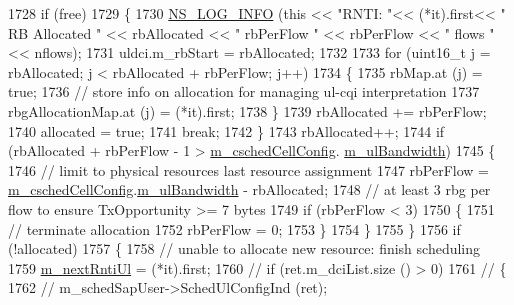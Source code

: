 \begin{DoxyCode}
1728           \textcolor{keywordflow}{if} (free)
1729             \{
1730               \hyperlink{group__logging_gafbd73ee2cf9f26b319f49086d8e860fb}{NS\_LOG\_INFO} (\textcolor{keyword}{this} << \textcolor{stringliteral}{"RNTI: "}<< (*it).first<< \textcolor{stringliteral}{" RB Allocated "} << rbAllocated << \textcolor{stringliteral}{"
       rbPerFlow "} << rbPerFlow << \textcolor{stringliteral}{" flows "} << nflows);
1731               uldci.m\_rbStart = rbAllocated;
1732 
1733               \textcolor{keywordflow}{for} (uint16\_t j = rbAllocated; j < rbAllocated + rbPerFlow; j++)
1734                 \{
1735                   rbMap.at (j) = \textcolor{keyword}{true};
1736                   \textcolor{comment}{// store info on allocation for managing ul-cqi interpretation}
1737                   rbgAllocationMap.at (j) = (*it).first;
1738                 \}
1739               rbAllocated += rbPerFlow;
1740               allocated = \textcolor{keyword}{true};
1741               \textcolor{keywordflow}{break};
1742             \}
1743           rbAllocated++;
1744           \textcolor{keywordflow}{if} (rbAllocated + rbPerFlow - 1 > \hyperlink{classns3_1_1PfFfMacScheduler_a0be1f7a1e78824b031e48208b8af1048}{m\_cschedCellConfig}.
      \hyperlink{structns3_1_1FfMacCschedSapProvider_1_1CschedCellConfigReqParameters_a5ab5b102878e6e7e7727a14af4a64d2f}{m\_ulBandwidth})
1745             \{
1746               \textcolor{comment}{// limit to physical resources last resource assignment}
1747               rbPerFlow = \hyperlink{classns3_1_1PfFfMacScheduler_a0be1f7a1e78824b031e48208b8af1048}{m\_cschedCellConfig}.\hyperlink{structns3_1_1FfMacCschedSapProvider_1_1CschedCellConfigReqParameters_a5ab5b102878e6e7e7727a14af4a64d2f}{m\_ulBandwidth} - rbAllocated;
1748               \textcolor{comment}{// at least 3 rbg per flow to ensure TxOpportunity >= 7 bytes}
1749               \textcolor{keywordflow}{if} (rbPerFlow < 3)
1750                 \{
1751                   \textcolor{comment}{// terminate allocation}
1752                   rbPerFlow = 0;
1753                 \}
1754             \}
1755         \}
1756       \textcolor{keywordflow}{if} (!allocated)
1757         \{
1758           \textcolor{comment}{// unable to allocate new resource: finish scheduling}
1759           \hyperlink{classns3_1_1PfFfMacScheduler_ad4bed67ae396b364734c2cc0acc7e2ec}{m\_nextRntiUl} = (*it).first;
1760 \textcolor{comment}{//          if (ret.m\_dciList.size () > 0)}
1761 \textcolor{comment}{//            \{}
1762 \textcolor{comment}{//              m\_schedSapUser->SchedUlConfigInd (ret);}

\end{DoxyCode}
